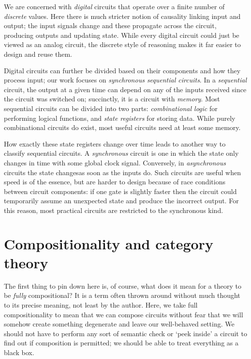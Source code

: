 We are concerned with \emph{digital} circuits that operate over a finite
number of \emph{discrete} values.
Here there is much stricter notion of causality linking input and output; the
input signals change and these propagate across the circuit, producing outputs
and updating state.
While every digital circuit could just be viewed as an analog circuit, the
discrete style of reasoning makes it far easier to design and reuse them.

\begin{center}
\end{center}

Digital circuits can further be divided based on their components and how they
process input; our work focuses on \emph{synchronous sequential circuits}.
In a \emph{sequential} circuit, the output at a given time can depend on any of
the inputs received since the circuit was switched on; succinctly, it is a
circuit with \emph{memory}.
Most sequential circuits can be divided into two parts:
\emph{combinational logic} for performing logical functions, and
\emph{state registers} for storing data.
While purely combinational circuits do exist, most useful circuits need
at least some memory.

How exactly these state registers change over time leads to another way
to classify sequential circuits.
A \emph{synchronous} circuit is one in which the state only changes in time with
some global clock signal.
Conversely, in \emph{asynchronous} circuits the state changesas soon as the
inputs do.
Such circuits are useful when speed is of the essence, but are harder to design
because of race conditions between circuit components: if one gate is slightly
faster then the circuit could temporarily assume an unexpected state and produce
the incorrect output.
For this reason, most practical circuits are restricted to the synchronous
kind.

\section{Compositionality and category theory}

The first thing to pin down here is, of course, what does it mean for a theory
to be \emph{fully} compositional?
It is a term often thrown around without much thought to its precise meaning,
not least by the author.
Here, we take full compositionality to mean that we can compose circuits
without fear that we will somehow create something degenerate and leave our
well-behaved setting.
We should not have to perform any sort of semantic check or `peek inside' a
circuit to find out if composition is permitted; we should be able to treat
everything as a black box.

